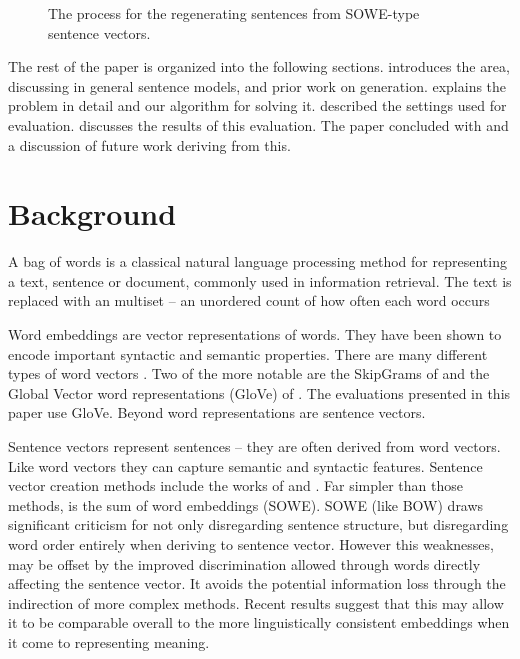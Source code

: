 \documentclass{llncs}
\begin{document}
\begin{figure}
	\centering 
	
	\caption{The process for the regenerating sentences from SOWE-type sentence vectors.}
	\label{block_diagram}
\end{figure}

The rest of the paper is organized into the following sections.  introduces the area, discussing in general sentence models, and prior work on generation.  explains the problem in detail and our algorithm for solving it.  described the settings used for evaluation.  discusses the results of this evaluation. The paper concluded with  and a discussion of future work deriving from this.


\section{Background}\label{relwork}
A bag of words is a classical natural language processing method for representing a text, sentence or document, commonly used in information retrieval. The text is replaced with an multiset -- an unordered count of how often each word occurs 

Word embeddings are vector representations of words. They have been shown to encode important syntactic and semantic properties. There are many different types of word vectors \cite{Yin2015}. Two of the more notable are the SkipGrams of \cite{mikolov2013efficient,mikolov2013linguisticsubstructures} and the Global Vector word representations (GloVe) of \cite{pennington2014glove}. The evaluations presented in this paper use GloVe. Beyond word representations are sentence vectors. 

Sentence vectors represent sentences -- they are often derived from word vectors. Like word vectors they can capture semantic and syntactic features. Sentence vector creation methods include the works of \textcite{le2014distributed} and \textcite{socher2014recursive}. Far simpler than those methods, is the  sum of word embeddings (SOWE). SOWE (like BOW) draws significant criticism for not only disregarding sentence structure, but disregarding word order entirely when deriving to sentence vector. However this weaknesses, may be offset by the improved discrimination allowed through words directly affecting the sentence vector. It avoids the potential information loss through the indirection of more complex methods. Recent results suggest that this may allow it to be comparable overall to the more linguistically consistent embeddings when it come to representing meaning. 
\end{document}
